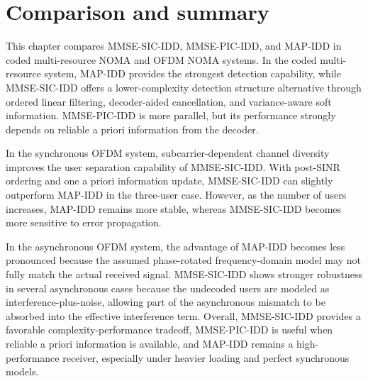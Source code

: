 \section{Comparison and summary}

This chapter compares MMSE-SIC-IDD, MMSE-PIC-IDD, and MAP-IDD in coded multi-resource NOMA and OFDM NOMA systems. In the coded multi-resource system, MAP-IDD provides the strongest detection capability, while MMSE-SIC-IDD offers a lower-complexity detection structure alternative through ordered linear filtering, decoder-aided cancellation, and variance-aware soft information. 
MMSE-PIC-IDD is more parallel, but its performance strongly depends on reliable a priori information from the decoder.

In the synchronous OFDM system, subcarrier-dependent channel diversity improves the user separation capability of MMSE-SIC-IDD. With post-SINR ordering and one a priori information update, MMSE-SIC-IDD can slightly outperform MAP-IDD in the three-user case. 
However, as the number of users increases, MAP-IDD remains more stable, whereas MMSE-SIC-IDD becomes more sensitive to error propagation.

In the asynchronous OFDM system, the advantage of MAP-IDD becomes less pronounced because the assumed phase-rotated frequency-domain model may not fully match the actual received signal. 
MMSE-SIC-IDD shows stronger robustness in several asynchronous cases because the undecoded users are modeled as interference-plus-noise, allowing part of the asynchronous mismatch to be absorbed into the effective interference term. 
Overall, MMSE-SIC-IDD provides a favorable complexity-performance tradeoff, MMSE-PIC-IDD is useful when reliable a priori information is available, and MAP-IDD remains a high-performance receiver, especially under heavier loading and perfect synchronous models.
